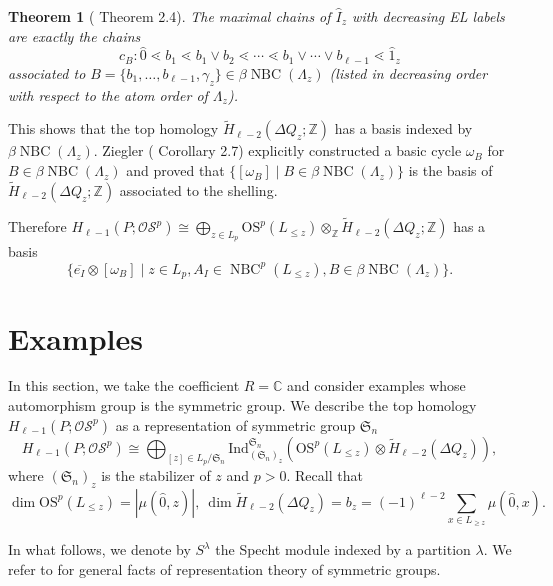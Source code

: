 \documentclass{amsart}
\numberwithin{equation}{section}
\newtheorem{thm}{Theorem}[section]
\theoremstyle{plain}
\theoremstyle{remark}
\theoremstyle{definition}
\numberwithin{equation}{section}
\newcommand{\C}{\mathbb{C}}
\newcommand{\Z}{\mathbb{Z}}
\newcommand{\OS}{\mathrm{OS}}
\newcommand{\sOS}{\mathscr{OS}}
\DeclareMathOperator{\NBC}{NBC}
\begin{document}
\begin{thm}[\cite{Ziegler1992} Theorem 2.4]
    The maximal chains of $\hat I_z$ with decreasing EL labels are exactly the chains
    \[
    c_B: \hat 0 \lessdot b_1 \lessdot b_1\vee b_2 \lessdot \cdots \lessdot b_1\vee\cdots\vee b_{\ell-1}\lessdot \hat 1_z
    \]
    associated to $B=\{b_1,\ldots,b_{\ell-1},\gamma_z\}\in \beta\NBC(\Lambda_z)$ (listed in decreasing order with respect to the atom order of $\Lambda_z$).
\end{thm}

This shows that the top homology $\widetilde{H}_{\ell-2}(\Delta Q_z;\Z)$ has a basis indexed by $\beta\NBC(\Lambda_z)$. Ziegler (\cite{Ziegler1992} Corollary 2.7) explicitly constructed a basic cycle $\omega_B$ for $B\in\beta\NBC(\Lambda_z)$ and proved that $\{[\omega_B]\mid B\in\beta\NBC(\Lambda_z)\}$ is the basis of $\widetilde{H}_{\ell-2}(\Delta Q_z;\Z)$ associated to the shelling.

Therefore $H_{\ell-1}(P;\sOS^p)\cong\bigoplus_{z\in L_p}\OS^p(L_{\leq z})\otimes_{\Z}\widetilde{H}_{\ell-2}(\Delta Q_z;\Z)$ has a basis
\[
\{\overline{e_I}\otimes [\omega_B]\mid z\in L_p, A_I\in\NBC^p(L_{\leq z}), B\in\beta\NBC(\Lambda_z)\}.
\]


\section{Examples}
In this section, we take the coefficient $R=\C$ and consider examples whose automorphism group is the symmetric group. We describe the top homology $H_{\ell-1}(P;\sOS^p)$ as a representation of symmetric group $\mathfrak{S}_n$
\[
H_{\ell-1}(P;\sOS^p)\cong \bigoplus_{[z]\in L_p/\mathfrak{S}_n}\mathrm{Ind}^{\mathfrak{S}_n}_{(\mathfrak{S}_n)_z}\left(\OS^p(L_{\leq z})\otimes \widetilde{H}_{\ell-2}(\Delta Q_z) \right),
\]
where $(\mathfrak{S}_n)_z$ is the stabilizer of $z$ and $p>0$. Recall that 
\[
\dim \OS^p(L_{\leq z})=|\mu(\hat 0, z)|,~\dim \widetilde{H}_{\ell-2}(\Delta Q_z)=b_z=(-1)^{\ell-2}\sum_{x\in L_{\geq z}}\mu(\hat 0,x).
\]

In what follows, we denote by $S^{\lambda}$ the Specht module indexed by a partition $\lambda$. We refer to \cite{Stanley2024} for general facts of representation theory of symmetric groups.
\end{document}
